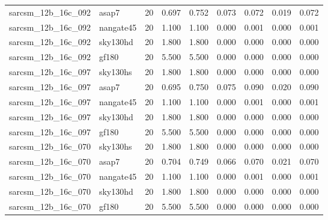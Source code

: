\begin{tabular}{llrrrrrrr}
sarcsm\_12b\_16c\_092 & asap7 & 20 & 0.697 & 0.752 & 0.073 & 0.072 & 0.019 & 0.072 \\
sarcsm\_12b\_16c\_092 & nangate45 & 20 & 1.100 & 1.100 & 0.000 & 0.001 & 0.000 & 0.001 \\
sarcsm\_12b\_16c\_092 & sky130hd & 20 & 1.800 & 1.800 & 0.000 & 0.000 & 0.000 & 0.000 \\
sarcsm\_12b\_16c\_092 & gf180 & 20 & 5.500 & 5.500 & 0.000 & 0.000 & 0.000 & 0.000 \\
sarcsm\_12b\_16c\_097 & sky130hs & 20 & 1.800 & 1.800 & 0.000 & 0.000 & 0.000 & 0.000 \\
sarcsm\_12b\_16c\_097 & asap7 & 20 & 0.695 & 0.750 & 0.075 & 0.090 & 0.020 & 0.090 \\
sarcsm\_12b\_16c\_097 & nangate45 & 20 & 1.100 & 1.100 & 0.000 & 0.001 & 0.000 & 0.001 \\
sarcsm\_12b\_16c\_097 & sky130hd & 20 & 1.800 & 1.800 & 0.000 & 0.000 & 0.000 & 0.000 \\
sarcsm\_12b\_16c\_097 & gf180 & 20 & 5.500 & 5.500 & 0.000 & 0.000 & 0.000 & 0.000 \\
sarcsm\_12b\_16c\_070 & sky130hs & 20 & 1.800 & 1.800 & 0.000 & 0.000 & 0.000 & 0.000 \\
sarcsm\_12b\_16c\_070 & asap7 & 20 & 0.704 & 0.749 & 0.066 & 0.070 & 0.021 & 0.070 \\
sarcsm\_12b\_16c\_070 & nangate45 & 20 & 1.100 & 1.100 & 0.000 & 0.001 & 0.000 & 0.001 \\
sarcsm\_12b\_16c\_070 & sky130hd & 20 & 1.800 & 1.800 & 0.000 & 0.000 & 0.000 & 0.000 \\
sarcsm\_12b\_16c\_070 & gf180 & 20 & 5.500 & 5.500 & 0.000 & 0.000 & 0.000 & 0.000 \\
\bottomrule
\end{tabular}

